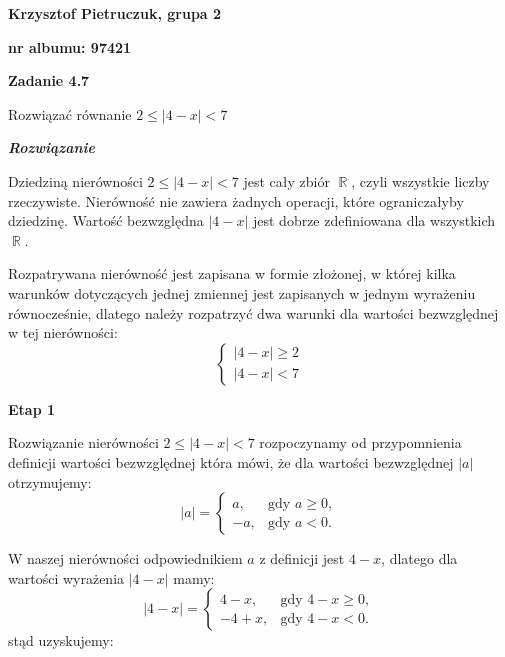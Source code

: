 \documentclass[12pt, a4paper]{report}
\DeclareMathOperator{\R}{\mathbb{R}}
\begin{document}
    \begin{center}
        \textbf{Krzysztof Pietruczuk, grupa 2}

        \textbf{nr albumu: 97421}
    \end{center}

    \medskip

    \noindent
    \textbf{Zadanie 4.7}

    \noindent
    Rozwiązać równanie $2 \leq |4 - x| < 7$

    \bigskip
    \noindent
    \emph{\textbf{Rozwiązanie}}


    \noindent
    Dziedziną nierówności $2 \leq |4 - x| < 7$ jest cały zbiór $\R$, czyli wszystkie liczby rzeczywiste.
    Nierówność nie zawiera żadnych operacji, które ograniczałyby dziedzinę. Wartość bezwzględna $|4 - x|$
    jest dobrze zdefiniowana dla wszystkich $\R$.

    \medskip

    \noindent
    Rozpatrywana nierówność jest zapisana w formie złożonej, w której kilka warunków dotyczących jednej zmiennej
    jest zapisanych w jednym wyrażeniu równocześnie, dlatego należy rozpatrzyć dwa warunki dla wartości bezwzględnej w tej nierówności:
    \[
        \begin{cases}
            |4 - x| \geq 2 \\
            |4 - x| < 7
        \end{cases}
    \]

    \vspace{20pt}                            %

    \noindent
    \textbf{Etap 1}

    \noindent
    Rozwiązanie nierówności $2 \leq |4 - x| < 7$ rozpoczynamy od przypomnienia definicji wartości bezwzględnej która mówi,
    że dla wartości bezwzględnej $|a|$ otrzymujemy:
    \[
        |a| = \begin{cases}
                  a, & \text{gdy } a \geq 0, \\
                  -a, & \text{gdy } a < 0.
        \end{cases}
    \]

    \noindent
    W naszej nierówności odpowiednikiem $a$ z definicji jest $4-x$,
    dlatego dla wartości wyrażenia $|4-x|$ mamy:
    \[
        |4-x| = \begin{cases}
                  4-x, & \text{gdy } 4-x \geq 0, \\
                  -4+x, & \text{gdy } 4-x < 0.
        \end{cases}
    \]
    stąd uzyskujemy:
\end{document}
